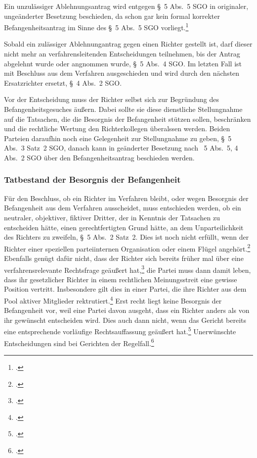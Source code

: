 Ein unzulässiger Ablehnungsantrag wird entgegen \S~5 Abs.~5 SGO in originaler, ungeänderter Besetzung beschieden, da schon gar kein formal korrekter Befangenheitsantrag im Sinne des \S~5 Abs.~5 SGO vorliegt.\footnote{\cites[S.~1]{BSG201305062BefangenheitI}{BSG201305062BefangenheitII}.}

Sobald ein zulässiger Ablehnungantrag gegen einen Richter gestellt ist, darf dieser nicht mehr an verfahrensleitenden Entscheidungen teilnehmen, bis der Antrag abgelehnt wurde oder angnommen wurde, \S~5 Abs.~4 SGO.
Im letzten Fall ist mit Beschluss aus dem Verfahren ausgeschieden und wird durch den nächsten Ersatzrichter ersetzt, \S~4 Abs.~2 SGO.

Vor der Entscheidung muss der Richter selbst sich zur Begründung des Befangenheitsgesuches äußern.
Dabei sollte sie diese dienstliche Stellungnahme auf die Tatsachen, die die Besorgnis der Befangenheit stützen sollen, beschränken und die rechtliche Wertung den Richterkollegen überalssen werden.
Beiden Parteien daraufhin noch eine Gelegenheit zur Stellungnahme zu geben, \S~5 Abs.~3 Satz~2 SGO, danach kann in geänderter Besetzung nach \SSS~5 Abs.~5, 4 Abs.~2 SGO über den Befangenheitsantrag beschieden werden.

\subsubsection{Tatbestand der Besorgnis der Befangenheit}
\label{Zusammensetzung:Spruchkoerper:Befangenheitsbesorgnis:Tatbestand}
Für den Beschluss, ob ein Richter im Verfahren bleibt, oder wegen Besorgnis der Befangenheit aus dem Verfahren ausscheidet, muss entschieden werden, ob ein neutraler, objektiver, fiktiver Dritter, der in Kenntnis der Tatsachen zu entscheiden hätte, einen gerechtfertigten Grund hätte, an dem Unparteilichkeit des Richters zu zweifeln, \S~5 Abs.~2 Satz~2.
Dies ist noch nicht erfüllt, wenn der Richter einer speziellen parteiinternen Organisation oder einem Flügel angehört.\footnote{\cite[S.~6]{BSG115HSBefangeheitIII}.}
Ebenfalls genügt dafür nicht, dass der Richter sich bereits früher mal über eine verfahrensrelevante Rechtsfrage geäußert hat,\footnote{\cite{BGHXIZR38801}.} die Partei muss dann damit leben, dass ihr gesetzlicher Richter in einem rechtlichen Meinungsstreit eine gewisse Position vertritt.
Insbesondere gilt dies in einer Partei, die ihre Richter aus dem Pool aktiver Mitglieder rektrutiert.\footnote{\cites[Lenski][\S~14 Rn~15]{lenski2011parteiengesetz}.}
Erst recht liegt keine Besorgnis der Befangenheit vor, weil eine Partei davon ausgeht, dass ein Richter anders als von ihr gewünscht entscheiden wird.
Dies auch dann nicht, wenn das Gericht bereits eine entsprechende vorläufige Rechtsauffassung geäußert hat.\footnote{\cites[S.~6]{BSG20131028}.}
Unerwünschte Entscheidungen sind bei Gerichten der Regelfall.\footnote{\cites[S.~2]{BSG201305062BefangenheitI}.}

